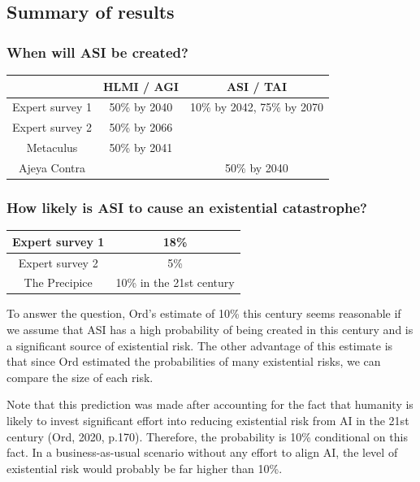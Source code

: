 \documentclass{article}
\begin{document}
\subsection{Summary of results}

\subsubsection{When will ASI be created?}

\vspace{2mm}

\begin{tabular}{|c|c|c|}
\hline
& HLMI / AGI & ASI / TAI\\
\hline
Expert survey 1 & 50\% by 2040 & 10\% by 2042, 75\% by 2070 \\
\hline
Expert survey 2 & 50\% by 2066 & \\
\hline
Metaculus & 50\% by 2041 & \\
\hline
Ajeya Contra & & 50\% by 2040 \\
\hline
\end{tabular}

\subsubsection{How likely is ASI to cause an existential catastrophe?}

\vspace{2mm}

\begin{tabular}{|c|c|}
\hline
Expert survey 1 & 18\% \\
\hline
Expert survey 2 & 5\% \\
\hline
The Precipice & 10\% in the 21st century \\
\hline
\end{tabular}

\vspace{5mm}

To answer the question, Ord’s estimate of 10\% this century seems reasonable if we assume that ASI has a high probability of being created in this century and is a significant source of existential risk. The other advantage of this estimate is that since Ord estimated the probabilities of many existential risks, we can compare the size of each risk.

Note that this prediction was made after accounting for the fact that humanity is likely to invest significant effort into reducing existential risk from AI in the 21st century (Ord, 2020, p.170). Therefore, the probability is 10\% conditional on this fact. In a business-as-usual scenario without any effort to align AI, the level of existential risk would probably be far higher than 10\%.
\end{document}
